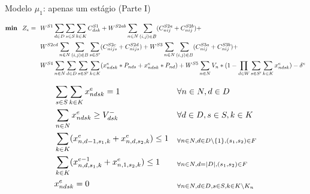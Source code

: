 \documentclass[8pt,mathserif,professionalfont]{beamer}
\begin{document}
\begin{frame}{Modelo $\mu_1$: apenas um estágio (Parte I)}

\begin{samepage}
\begin{align}
   \textbf{min~~} 
   Z_e =~~&W^{S1} \sum_{d \in D}\sum_{s \in S}\sum_{k \in K} C^{S1}_{dsk}    \notag +
          W^{S2ab}  \sum_{n \in N}\sum_{(i,j) \in B} (C^{S2a}_{nij} + C^{S2b}_{nij}) + \\ \notag
  		& W^{S2cd}  \sum_{n \in N}\sum_{(i,j) \in B}\sum_{s \in S'} (C^{S2c}_{nijs} + C^{S2d}_{nijs}) +
		  W^{S3}    \sum_{n \in N}\sum_{(i,j) \in B} (C^{S3a}_{nij} + C^{S3b}_{nij}) + \\ \notag
		& W^{S4}    \sum_{n \in N}\sum_{d \in D}\sum_{s \in S'}\sum_{k \in K} (x^e_{ndsk} * P_{nds} + x^e_{ndsk} * P_{nd}) + 
		W^{S5}    \sum_{n \in N} V_{n} * ( 1- \prod_{d \in W} \sum_{s \in S'}\sum_{k \in K} x^e_{ndsk}) -\delta^e
\end{align}  

\begin{align}
		& \sum_{s \in S} \sum_{k \in K} x^e_{ndsk} = 1    && \forall n \in N, d \in D \label{eH1} \\
& \sum_{n \in N} x^e_{ndsk} \geq V^-_{dsk}   && \forall d \in D, s \in S, k \in K \label{eH2} \\
& \sum_{k \in K} (x^e_{n,d-1,s_1,k} + x^e_{n,d,s_2,k}) \leq 1 && _{\forall n \in N, d \in D\setminus \{1\}, (s_1,s_2) \in F} \label{eH3a} \\
& \sum_{k \in K} (x^{e-1}_{n,d,s_1,k} + x^e_{n,1,s_2,k}) \leq 1 && _{\forall n \in N, d = |D|, (s_1,s_2) \in F}\\
& x^e_{ndsk} = 0   && _{\forall n \in N, d \in D, s \in S, k \in K\setminus K_n} \label{eH4} \\ \notag
\end{align}  
\end{samepage}


\end{frame}
\end{document}
